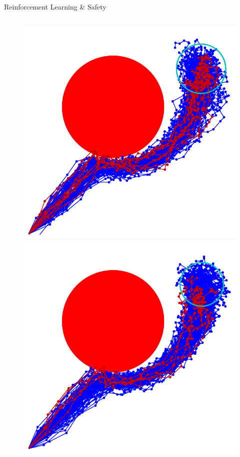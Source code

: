 \documentclass[lecture]{beamer}
\begin{document}
\begin{frame}{\normalsize Reinforcement Learning \& Safety}
\begin{columns}
\begin{overlayarea}{\textwidth}{.55\textheight}
\begin{figure}
{	}
	      \only<13>
        {
        \center
	\includegraphics[width=1\textwidth,clip]{Codes/RL/RLSafety10.pdf}
	}
	      \only<14>
        {
        \center
	\includegraphics[width=1\textwidth,clip]{Codes/RL/RLSafety11.pdf}
}
\end{figure}
\end{overlayarea}
\end{columns}
\end{frame}
\end{document}
